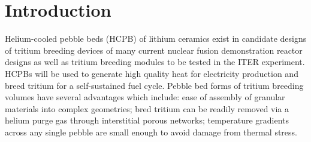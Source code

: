 

\chapter{Introduction} \label{sec:introduction}
Helium-cooled pebble beds (HCPB) of lithium ceramics exist in candidate designs of tritium breeding devices of many current nuclear fusion demonstration reactor designs as well as tritium breeding modules to be tested in the ITER experiment. HCPBs will be used to generate high quality heat for electricity production and breed tritium for a self-sustained fuel cycle. Pebble bed forms of tritium breeding volumes have several advantages which include: ease of assembly of granular materials into complex geometries; bred tritium can be readily removed via a helium purge gas through interstitial porous networks; temperature gradients across any single pebble are small enough to avoid damage from thermal stress. 

